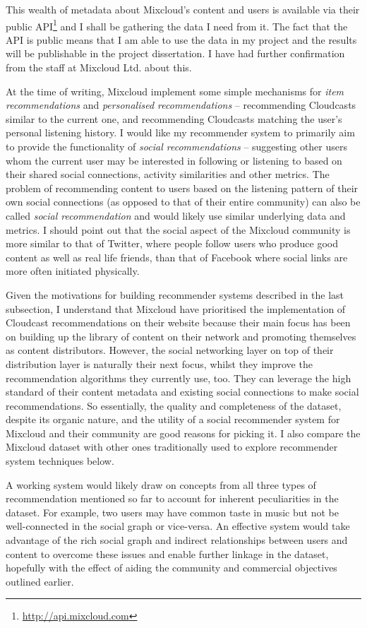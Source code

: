 This wealth of metadata about Mixcloud's content and users is available via their public API\footnote{\url{http://api.mixcloud.com}} and I shall be gathering the data I need from it. The fact that the API is public means that I am able to use the data in my project and the results will be publishable in the project dissertation. I have had further confirmation from the staff at Mixcloud Ltd. about this.

At the time of writing, Mixcloud implement some simple mechanisms for \emph{item recommendations} and \emph{personalised recommendations} -- recommending Cloudcasts similar to the current one, and recommending Cloudcasts matching the user's personal listening history. I would like my recommender system to primarily aim to provide the functionality of \emph{social recommendations} -- suggesting other users whom the current user may be interested in following or listening to based on their shared social connections, activity similarities and other metrics. The problem of recommending content to users based on the listening pattern of their own social connections (as opposed to that of their entire community) can also be called \emph{social recommendation} and would likely use similar underlying data and metrics. I should point out that the social aspect of the Mixcloud community is more similar to that of Twitter, where people follow users who produce good content as well as real life friends, than that of Facebook where social links are more often initiated physically.

Given the motivations for building recommender systems described in the last subsection, I understand that Mixcloud have prioritised the implementation of Cloudcast recommendations on their website because their main focus has been on building up the library of content on their network and promoting themselves as content distributors. However, the social networking layer on top of their distribution layer is naturally their next focus, whilst they improve the recommendation algorithms they currently use, too. They can leverage the high standard of their content metadata and existing social connections to make social recommendations. So essentially, the quality and completeness of the dataset, despite its organic nature, and the utility of a social recommender system for Mixcloud and their community are good reasons for picking it. I also compare the Mixcloud dataset with other ones traditionally used to explore recommender system techniques below.

A working system would likely draw on concepts from all three types of recommendation mentioned so far to account for inherent peculiarities in the dataset. For example, two users may have common taste in music but not be well-connected in the social graph or vice-versa. An effective system would take advantage of the rich social graph and indirect relationships between users and content to overcome these issues and enable further linkage in the dataset, hopefully with the effect of aiding the community and commercial objectives outlined earlier.


